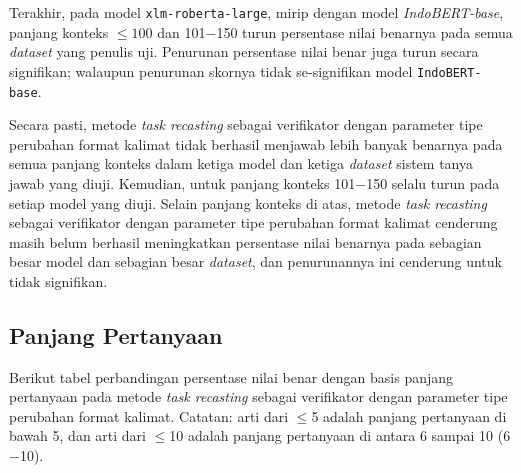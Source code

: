 Terakhir, pada model \texttt{xlm-roberta-large}, mirip dengan model \emph{IndoBERT-base}, panjang konteks $\leq100$ dan 101$-$150 turun persentase nilai benarnya pada semua \emph{dataset} yang penulis uji. Penurunan persentase nilai benar juga turun secara signifikan; walaupun penurunan skornya tidak se-signifikan model \texttt{IndoBERT-base}.

Secara pasti, metode \emph{task recasting} sebagai verifikator dengan parameter tipe perubahan format kalimat tidak berhasil menjawab lebih banyak benarnya pada semua panjang konteks dalam ketiga model dan ketiga \emph{dataset} sistem tanya jawab yang diuji. Kemudian, untuk panjang konteks 101$-$150 selalu turun pada setiap model yang diuji. Selain panjang konteks di atas, metode \emph{task recasting} sebagai verifikator dengan parameter tipe perubahan format kalimat cenderung masih belum berhasil meningkatkan persentase nilai benarnya pada sebagian besar model dan sebagian besar \emph{dataset}, dan penurunannya ini cenderung untuk tidak signifikan.

\subsection{Panjang Pertanyaan}
Berikut tabel perbandingan persentase nilai benar dengan basis panjang pertanyaan pada metode \emph{task recasting} sebagai verifikator dengan parameter tipe perubahan format kalimat. Catatan: arti dari $\leq$5 adalah panjang pertanyaan di bawah 5, dan arti dari $\leq$10 adalah panjang pertanyaan di antara 6 sampai 10 (6$-$10).


